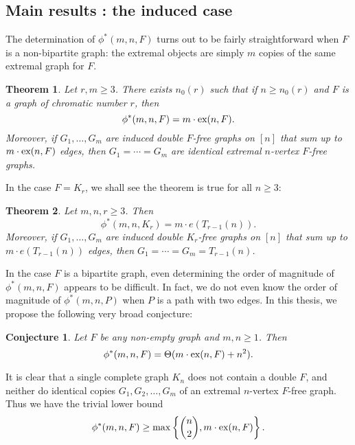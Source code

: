 \documentclass[12pt]{article}
\newcounter{foo}
\newtheorem{theorem}{Theorem}
\newtheorem{conjecture}{Conjecture}[foo]
\newcommand*{\ex}{\textnormal{ex}}
\begin{document}
\subsection{Main results : the induced case}

The determination of $\phi^*(m, n, F)$ turns out to be fairly straightforward when $F$ is a non-bipartite graph: the extremal objects are simply $m$ copies of the same extremal graph for $F$.

\begin{theorem}\label{thm:inducedF}
  Let $r, m \geq 3$. There exists $n_0(r)$ such that if $n \geq n_0(r)$ and $F$ is a graph of chromatic number $r$, then
  \[
    \phi^*(m, n, F) = m \cdot \ex(n, F).
  \]
  Moreover, if $G_1, \ldots, G_m$ are induced double $F$-free graphs on $[n]$ that sum up to $m \cdot \ex(n, F)$ edges, then $G_1 = \cdots = G_m$ are identical extremal $n$-vertex $F$-free graphs.
\end{theorem}

In the case $F = K_r$, we shall see the theorem is true for all $n \geq 3$:

\begin{theorem}\label{thm:complete}
  Let $m, n, r \geq 3$. Then 
  \[
    \phi^*(m, n, K_{r}) = m \cdot e(T_{r - 1}(n)).
  \]
  Moreover, if $G_1, \ldots, G_m$ are induced double $K_r$-free graphs on $[n]$ that sum up to $m \cdot e(T_{r - 1}(n))$ edges, then $G_1 = \cdots = G_m = T_{r - 1}(n)$.
\end{theorem}

In the case $F$ is a bipartite graph, even determining the order of magnitude of $\phi^*(m, n, F)$ appears to be difficult. In fact, we do not even know the order of magnitude of $\phi^*(m, n, P)$ when $P$ is a path with two edges. In this thesis, we propose the following very broad conjecture:

\begin{conjecture}\label{conj:main}
Let $F$ be any non-empty graph and $m, n \geq 1$. Then 
\[ 
  \phi^*(m, n, F) = \Theta(m \cdot \ex(n, F) + n^2).
\]
\end{conjecture}

It is clear that a single complete graph $K_n$ does not contain a double $F$, and neither do identical copies $G_1, G_2, \dots, G_m$ of an extremal $n$-vertex $F$-free graph. Thus we have the trivial lower bound 
\[ 
  \phi^*(m, n, F) \geq \max\left\{\binom{n}{2}, m \cdot \ex(n, F)\right\}.
\]
\end{document}

